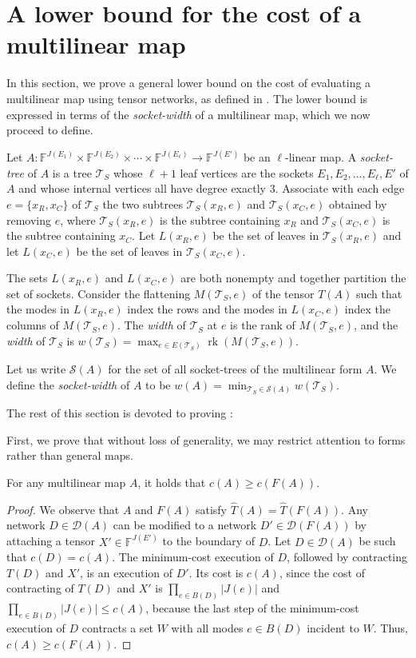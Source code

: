 \documentclass{toc}
\newcommand{\rk}{\ensuremath{\operatorname{rk}}}
\newcommand{\F}{\ensuremath{\mathbb{F}}}
\newcommand{\ts}{\ensuremath{\mathcal{T}_S}}
\begin{document}
\section{A lower bound for the cost of a multilinear map}
\label{sec:general lower bound}

In this section, we prove a general lower bound on the cost of
evaluating a multilinear map using tensor networks, as defined in
.  The lower bound is expressed in terms of the \emph{socket-width} of a multilinear map, which we
now proceed to define.

Let $A:\F^{J(E_1)}\times\F^{J(E_2)}\times\cdots \times\F^{J(E_\ell)}
\rightarrow \F^{J(E')}$ be an $\ell$-linear map.  A \emph{socket-tree}
of $A$ is a tree $\ts$ whose $\ell+1$ leaf vertices are the sockets
$E_1,E_2,\ldots,E_\ell, E'$ of $A$ and whose internal vertices all have
degree exactly $3$.  Associate with each edge $e = \{x_R, x_C\}$ of $\ts$
the two subtrees $\ts(x_R, e)$ and $\ts(x_C, e)$ obtained by
removing $e$, where $\ts(x_R, e)$ is the subtree containing $x_R$ and $\ts(x_C,
e)$ is the subtree containing $x_C$.  Let $L(x_R, e)$
be the set of leaves in $\ts(x_R, e)$ and let $L(x_C, e)$
be the set of leaves in $\ts(x_C, e)$.

The sets $L(x_R, e)$ and $L(x_C,e)$ are both nonempty and together
partition the set of sockets.  Consider the flattening $M(\ts,e)$ of the tensor $T(A)$ such that the modes in
$L(x_R,e)$ index the rows and the modes in  $L(x_C,e)$ index
the columns of $M(\ts,e)$.  The \emph{width} of $\ts$ at $e$ is the
rank of $M(\ts, e)$, and the \emph{width} of $\ts$ is
$w(\ts)=\max_{e\in E(\ts)} \rk(M(\ts,e))$.

Let us write $\mathscr{S}(A)$ for the set of all socket-trees of the
multilinear form $A$.  We define the \emph{socket-width} of $A$ to be
$w(A)=\min_{\ts\in\mathscr{S}(A)} w(\ts)$.

The rest of this section is devoted to proving :

\GeneralLowerBoundTheorem*

First, we prove that without loss of generality, we may restrict
attention to forms rather than general maps.

\begin{claim}
For any multilinear map $A$, it holds that $c(A) \ge c(F(A))$.
\end{claim}
\begin{proof}
We observe that $A$ and $F(A)$ satisfy $\hat{T}(A)=\hat{T}(F(A))$. Any network
$D\in \mathscr{D}(A)$ can be modified to a network
$D'\in \mathscr{D}(F(A))$ by attaching a tensor $X' \in \F^{J(E')}$ to the boundary
of $D$. Let $D\in \mathscr{D}(A)$ be such that
$c(D)=c(A)$. The minimum-cost execution of $D$, followed
by contracting $T(D)$ and $X'$, is an execution of $D'$. Its
cost is $c(A)$, since the cost of contracting of $T(D)$ and $X'$ is $\prod_{e \in B(D)} |J(e)|$ and $\prod_{e \in B(D)} |J(e)| \leq c(A)$, because the last step of the minimum-cost execution of $D$ contracts a set $W$ with all modes $e \in B(D)$ incident to $W$. Thus, $c(A)\ge c(F(A))$.
\end{proof}
\end{document}
